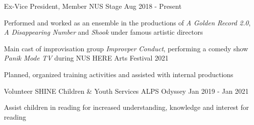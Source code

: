 

\begin{cventries}

  \cventry
    {Ex-Vice President, Member} %
    {NUS Stage} %
    {} %
    {Aug 2018 - Present} %
    {
      \begin{cvitems} %
        \item {Performed and worked as an ensemble in the productions of \textit{A Golden Record 2.0}, \textit{A Disappearing Number} and \textit{Shook} under famous artistic directors}
        \item {Main cast of improvisation group \textit{Improvper Conduct}, performing a comedy show \textit{Panik Mode TV} during NUS HERE Arts Festival 2021}
        \item {Planned, organized training activities and assisted with internal productions}
      \end{cvitems}
    }

  \cventry
    {Volunteer} %
    {SHINE Children \& Youth Services ALPS Odyssey} %
    {} %
    {Jan 2019 - Jan 2021} %
    {
      \begin{cvitems} %
        \item {Assist children in reading for increased understanding, knowledge and interest for reading}
      \end{cvitems}
    }

\end{cventries}
